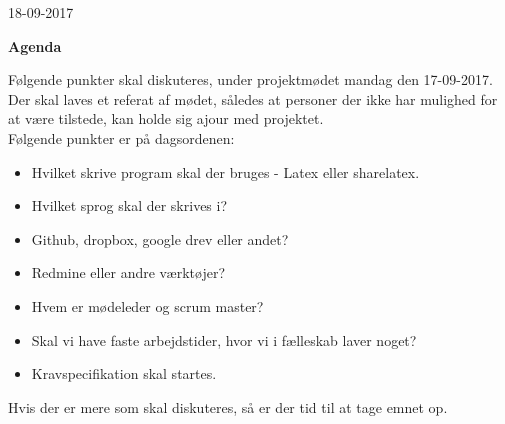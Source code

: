 \documentclass[a4paper,oneside,article]{memoir}
\begin{document}
\begin{flushright}
	18-09-2017
\end{flushright}
\begin{center}
	{\Huge \textbf{Agenda}}\\
\end{center}	

Følgende punkter skal diskuteres, under projektmødet mandag den 17-09-2017. Der skal laves et referat af mødet, således at personer der ikke har mulighed for at være tilstede, kan holde sig ajour med projektet.\\



Følgende punkter er på dagsordenen:

\begin{itemize}
	\item Hvilket skrive program skal der bruges - Latex eller sharelatex.
	\item Hvilket sprog skal der skrives i?
	\item Github, dropbox, google drev eller andet?
	\item Redmine eller andre værktøjer?
	\item Hvem er mødeleder og scrum master?
	\item Skal vi have faste arbejdstider, hvor vi i fælleskab laver noget?
	\item Kravspecifikation skal startes. 
\end{itemize}


Hvis der er mere som skal diskuteres, så er der tid til at tage emnet op.


	
\end{document}
